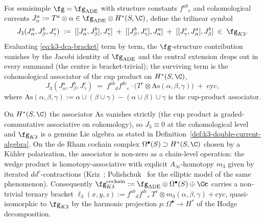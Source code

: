 \begin{definition}
\label{def:k3-jacobi-obstruction}
For semisimple $\fg = \fg_{\mathrm{ADE}}$ with structure constants
$f^{ab}{}_c$ and cohomological currents
$J^a_\alpha := T^a \otimes \alpha \in \fg_{\mathrm{ADE}} \otimes H^*(S, \C)$,
define the trilinear symbol
\[
 J_3(J^a_\alpha, J^b_\beta, J^c_\gamma)
 \;:=\; [[J^a_\alpha, J^b_\beta], J^c_\gamma]
 \;+\; [[J^b_\beta, J^c_\gamma], J^a_\alpha]
 \;+\; [[J^c_\gamma, J^a_\alpha], J^b_\beta]
 \;\in\; \fg_{K3}.
\]
Evaluating \eqref{eq:k3-dca-bracket} term by term, the $\fg$-structure
contribution vanishes by the Jacobi identity of $\fg_{\mathrm{ADE}}$
and the central extension drops out in every summand (the centre is
bracket-trivial); the surviving term is the cohomological associator
of the cup product on $H^*(S,\C)$,
\begin{equation}\label{eq:k3-jacobi-obstruction}
 J_3(J^a_\alpha, J^b_\beta, J^c_\gamma)
 \;=\; f^{ab}{}_d f^{dc}{}_e \cdot \bigl(T^e \otimes
 \mathrm{As}(\alpha, \beta, \gamma)\bigr)
 \;+\; \text{cyc},
\end{equation}
where
$\mathrm{As}(\alpha, \beta, \gamma) := \alpha \cup (\beta \cup \gamma)
 - (\alpha \cup \beta) \cup \gamma$ is the cup-product associator.
\end{definition}

\begin{proposition}
\label{prop:k3-jacobi-cochain-vs-cohomology}
On $H^*(S, \C)$ the associator $\mathrm{As}$ vanishes strictly
(the cup product is graded-commutative associative on cohomology),
so $J_3 \equiv 0$ at the cohomological level and $\fg_{K3}$ is a
genuine Lie algebra as stated in
Definition~\ref{def:k3-double-current-algebra}. On the de Rham
cochain complex $\Omega^\bullet(S) \supset H^*(S, \C)$ chosen by a
K\"ahler polarisation, the associator is non-zero as a chain-level
operation: the wedge product is homotopy-associative with explicit
$A_\infty$-homotopy $m_3$ given by iterated $dd^c$-contractions
(Kriz~\cite{Kriz94}; Polishchuk~\cite{Polishchuk2011} for the
elliptic model of the same phenomenon). Consequently
$\fg_{K3}^{\mathrm{cochain}}
:= \fg_{\mathrm{ADE}} \otimes \Omega^\bullet(S) \oplus \C\mathbf{c}$
carries a non-trivial ternary bracket
$\ell_3(x, y, z) := f^{ab}{}_d f^{dc}{}_e\,T^e \otimes
m_3(\alpha, \beta, \gamma) + \mathrm{cyc}$, quasi-isomorphic to
$\fg_{K3}$ by the harmonic projection $p : \Omega^\bullet \to H^*$
of the Hodge decomposition.
\end{proposition}

